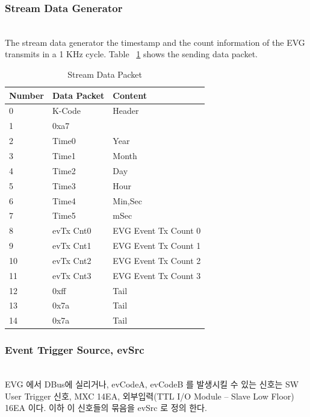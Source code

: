 \documentclass[journal]{IEEEtran}
\begin{document}
\subsubsection{Stream Data Generator}\hspace*{\fill} \\
The stream data generator the timestamp and the count information of the EVG transmits in a 1 KHz cycle.
Table ~\ref{stream_data_packet} shows the sending data packet.

\begin{table}[h!t]
	\centering
	\caption{Stream Data Packet}
	\label{stream_data_packet}
	
	\begin{tabular}{@{}lll@{}}
		
		\hline
		\textbf{Number}	& \textbf{Data Packet}			& \textbf{Content}\\
		\hline
		0				& K-Code						& Header\\
		1				& 0xa7			                &\\
		\hline
		2				& Time0							& Year\\
		3				& Time1                         & Month\\
		4				& Time2                         & Day\\
		5				& Time3                         & Hour\\
		6				& Time4                         & Min,Sec\\
		7				& Time5                         & mSec\\								
		\hline
		8				& evTx Cnt0						& EVG Event Tx Count 0\\        
		9				& evTx Cnt1						& EVG Event Tx Count 1\\        
		10				& evTx Cnt2						& EVG Event Tx Count 2\\        
		11				& evTx Cnt3						& EVG Event Tx Count 3\\        
		12				& 0xff							& Tail\\        
		13				& 0x7a							& Tail\\        								
		14				& 0x7a							& Tail\\        								
		\hline
	\end{tabular}
\end{table}

\subsubsection{Event Trigger Source, evSrc}\hspace*{\fill} \\
EVG 에서 DBus에 실리거나, evCodeA, evCodeB 를 발생시킬 수 있는 신호는 SW User Trigger 신호, MXC 14EA, 외부입력(TTL I/O Module – Slave Low Floor) 16EA 이다. 이하 이 신호들의 묶음을 evSrc 로 정의 한다.
\end{document}
